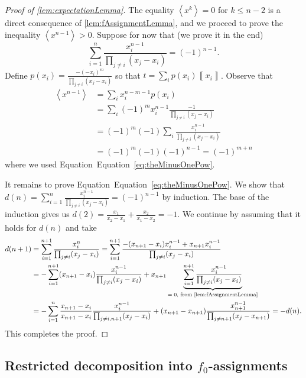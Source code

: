 \documentclass{theoretics}
\begin{document}
\begin{proof}[Proof of \ref{lem:expectationLemma}]
	The equality $\left\langle x^{k}\right\rangle =0$ for $k\leq n-2$ is a direct consequence of \ref{lem:fAssignmentLemma}, and we proceed to  prove the inequality $\left\langle x^{n-1}\right\rangle >0$. 
	Suppose for now that (we prove it in the end)
	\begin{equation}
		\sum_{i=1}^n\frac{x_i^{n-1}}{\prod_{j\neq i}(x_j-x_i)} = (-1)^{n-1}. 
		\label{eq:theMinusOnePow}
	\end{equation}
	Define $p(x_{i})=\frac{-(-x_{i})^{m}}{\prod_{j\neq i}(x_{j}-x_{i})}$ so that $t=\sum_{i}p(x_{i})\left\llbracket x_{i}\right\rrbracket $.
	Observe that 
	\begin{align*}
	\left\langle x^{n-1}\right\rangle  & =\sum_{i}x_{i}^{n-m-1}p(x_{i})\\
	& =\sum_{i}(-1)^{m}x_{i}^{n-1}\frac{-1}{\prod_{j\neq i}(x_{j}-x_{i})}\\
	& =(-1)^{m}(-1)\sum_{i}\frac{x_{i}^{n-1}}{\prod_{j\neq i}(x_{j}-x_{i})}\\
	& =(-1)^{m}(-1)(-1)^{n-1}=(-1)^{m+n}
	\end{align*}
	where we used Equation~Equation~\eqref{eq:theMinusOnePow}.

	It remains to prove Equation~Equation~\eqref{eq:theMinusOnePow}. We show that $d(n)=\sum_{i=1}^n\frac{x_i^{n-1}}{\prod_{j\neq i}(x_j-x_i)}=(-1)^{n-1}$ by induction. %
	The base of  the induction gives us $d(2)=\frac{x_1}{x_2-x_1}+\frac{x_2}{x_1-x_2}=-1$. We continue by assuming that it holds for $d(n)$ and take
	\begin{align*}
		d(n+1)&=\sum_{i=1}^{n+1}\frac{x_i^n}{\prod_{j\neq i}(x_j-x_i)}=\sum_{i=1}^{n+1}\frac{-(x_{n+1}-x_i)x_i^{n-1}+x_{n+1}x_i^{n-1}}{\prod_{j\neq i}(x_j-x_i)}\\
	&=-\sum_{i=1}^{n+1}(x_{n+1}-x_i)\frac{x_i^{n-1}}{\prod_{j\neq i}(x_j-x_i)}+x_{n+1}\underbrace{\sum_{i=1}^{n+1}\frac{x_i^{n-1}}{\prod_{j\neq i}(x_j-x_i)}}_{\text{$=0$, from \ref{lem:fAssignmentLemma}}}\\
	&=-\sum_{i=1}^{n}\frac{x_{n+1}-x_i}{x_{n+1}-x_i}\frac{x_i^{n-1}}{\prod_{j\neq i,n+1}(x_j-x_i)}+(x_{n+1}-x_{n+1})\frac{x_{n+1}^{n-1}}{\prod_{j\neq n+1}(x_j-x_{n+1})}=-d(n).
	\end{align*}
	This completes the proof.
\end{proof}



\subsection{Restricted decomposition into \texorpdfstring{$f_{0}$}{f0}-assignments}\label{subsec:Restricted-decomposition-into-monomials}
\end{document}

